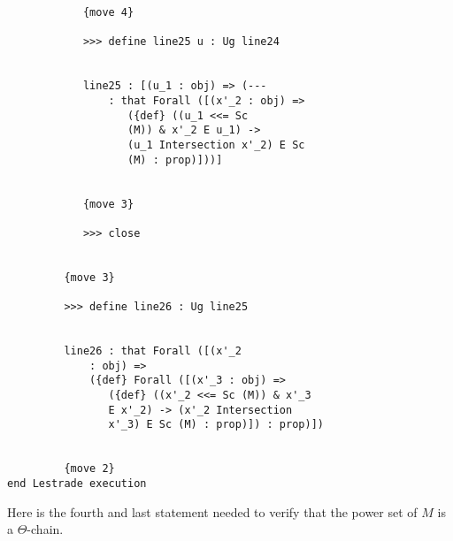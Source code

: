 \documentclass[12pt]{article}
\begin{document}
\begin{verbatim}
            {move 4}

            >>> define line25 u : Ug line24


            line25 : [(u_1 : obj) => (--- 
                : that Forall ([(x'_2 : obj) => 
                   ({def} ((u_1 <<= Sc 
                   (M)) & x'_2 E u_1) -> 
                   (u_1 Intersection x'_2) E Sc 
                   (M) : prop)]))]


            {move 3}

            >>> close


         {move 3}

         >>> define line26 : Ug line25


         line26 : that Forall ([(x'_2 
             : obj) => 
             ({def} Forall ([(x'_3 : obj) => 
                ({def} ((x'_2 <<= Sc (M)) & x'_3 
                E x'_2) -> (x'_2 Intersection 
                x'_3) E Sc (M) : prop)]) : prop)])


         {move 2}
end Lestrade execution
\end{verbatim}

Here is the fourth and last statement needed to verify that the power set of $M$ is a $\Theta$-chain.
\end{document}
